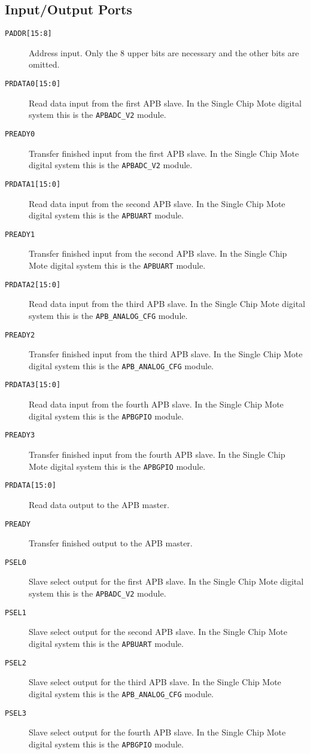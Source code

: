 \subsection{Input/Output Ports}
\begin{description}
	\item[\texttt{PADDR[15:8]}] Address input. Only the 8 upper bits are necessary and the other bits are omitted.
	\item[\texttt{PRDATA0[15:0]}] Read data input from the first APB slave. In the Single Chip Mote digital system this is the \texttt{APBADC\_V2} module.
	\item[\texttt{PREADY0}] Transfer finished input from the first APB slave. In the Single Chip Mote digital system this is the \texttt{APBADC\_V2} module.
	\item[\texttt{PRDATA1[15:0]}] Read data input from the second APB slave. In the Single Chip Mote digital system this is the \texttt{APBUART} module.
	\item[\texttt{PREADY1}] Transfer finished input from the second APB slave. In the Single Chip Mote digital system this is the \texttt{APBUART} module.
	\item[\texttt{PRDATA2[15:0]}] Read data input from the third APB slave. In the Single Chip Mote digital system this is the \texttt{APB\_ANALOG\_CFG} module.
	\item[\texttt{PREADY2}] Transfer finished input from the third APB slave. In the Single Chip Mote digital system this is the \texttt{APB\_ANALOG\_CFG} module.
	\item[\texttt{PRDATA3[15:0]}] Read data input from the fourth APB slave. In the Single Chip Mote digital system this is the \texttt{APBGPIO} module.
	\item[\texttt{PREADY3}] Transfer finished input from the fourth APB slave. In the Single Chip Mote digital system this is the \texttt{APBGPIO} module.
	\item[\texttt{PRDATA[15:0]}] Read data output to the APB master.
	\item[\texttt{PREADY}] Transfer finished output to the APB master.
	\item[\texttt{PSEL0}] Slave select output for the first APB slave. In the Single Chip Mote digital system this is the \texttt{APBADC\_V2} module.
	\item[\texttt{PSEL1}] Slave select output for the second APB slave. In the Single Chip Mote digital system this is the \texttt{APBUART} module.
	\item[\texttt{PSEL2}] Slave select output for the third APB slave. In the Single Chip Mote digital system this is the \texttt{APB\_ANALOG\_CFG} module.
	\item[\texttt{PSEL3}] Slave select output for the fourth APB slave. In the Single Chip Mote digital system this is the \texttt{APBGPIO} module.
\end{description}

